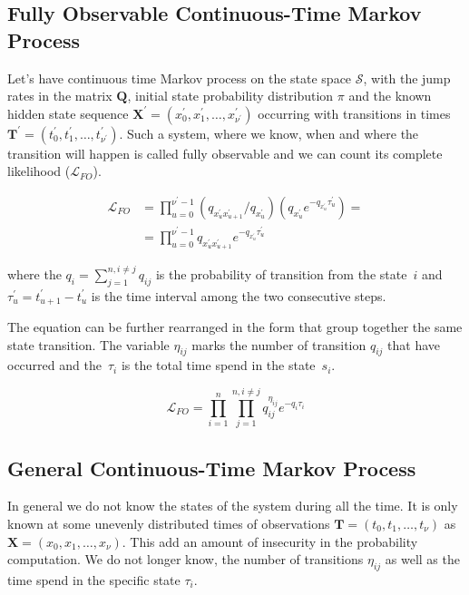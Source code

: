 \documentclass[thesis=M,english]{FITthesis}[2012/10/20]
\newcommand{\matr}[1]{\mathbf{#1}}
\begin{document}
\subsection{ Fully Observable Continuous-Time Markov Process }

Let's have continuous time Markov process on the state space $\mathcal{S}$, with the jump rates in the matrix $\matr{Q}$, initial state probability distribution $\pi$ and the known hidden state sequence $\matr{X^{'}}= ( x_0^{'}, x_1^{'}, \dots, x_{\nu^{'}}^{'} ) $ occurring with transitions in times $\matr{T^{'}} = ( t_0^{'}, t_1^{'}, \dots, t_{\nu^{'}}^{'} )$. Such a system, where we know, when and where the transition will happen is called fully observable and we can count its complete likelihood ($\mathcal{L}_{FO}$). 

\begin{equation}\label{eq:CL1}
\begin{aligned}  
 \mathcal{L}_{FO} &=  \prod_{u=0}^{\nu^{'}-1} ( q_{x_u^{'} x_{u+1}^{'}} / q_{x_u^{'}} )( q_{x_u^{'}} e^{ - q_{x_u^{'}} \tau_{u }^{'}}) = \\
    &= \prod_{u=0}^{\nu^{'}-1} q_{x_u^{'} x_{u+1}^{'}} e^{ - q_{x_u^{'}} \tau_{u}^{'}}
\end{aligned}
\end{equation}

where the $q_i = \sum_{j=1}^{n,i\neq j} q_{ij}$ is the probability of transition from the state~$i$ and   
$\tau_{u}^{'} = t_{u+1}^{'} - t_{u}^{'}$ is the time interval among the two consecutive steps.

The equation can be further rearranged in the form that group together the same state transition. The variable $\eta_{ij}$ marks the number of transition $q_{ij}$ that have occurred and the~$\tau_i$ is the total time spend in the state~$s_i$.

\begin{equation}\label{eq:CL2}
 \mathcal{L}_{FO} = \prod_{i=1}^{n} \prod_{j=1}^{n, i \neq j} q_{ij}^{\eta_{ij} } e^{ - q_i \tau_i }
\end{equation}

\subsection{ General Continuous-Time Markov Process }

In general we do not know the states of the system during all the time. It is only known at some unevenly distributed times of observations $\matr{T} = ( t_0, t_1, \dots, t_{\nu} )$ as $\matr{X}= (x_0, x_1, \dots, x_{\nu} )$. 
This add an amount of insecurity in the probability computation. We do not longer know, the number of transitions $\eta_{ij}$ as well as the time spend in the specific state $\tau_i$. 
\end{document}
